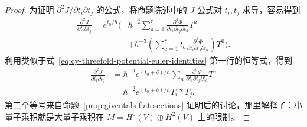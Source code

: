 \begin{proof}
为证明 $\partial^2J/\partial t_i\partial t_j$ 的公式，将命题陈述中的 $J$ 公式对 $t_i,t_j$ 求导，容易得到
\[
\begin{aligned}
\frac{\partial^2J}{\partial t_i\partial t_j}=e^{t_0/\hbar}\biggl(&
\hbar^{-2}\sum_{a=1}^r\frac{\partial^3\Phi}{\partial t_i\partial t_j\partial t_a}T^a\\
&+\hbar^{-3}\left(\sum_{a=1}^rt_a\frac{\partial^3\Phi}{\partial t_i\partial t_j\partial t_a}\right)T^0\biggr).
\end{aligned}
\]
利用类似于式~\eqref{eq:cy-threefold-potential-euler-identities} 第一行的恒等式，得到
\[
\begin{aligned}
\frac{\partial^2J}{\partial t_i\partial t_j}
&=\hbar^{-2}e^{(t_0+\delta)/\hbar}\sum_a
\frac{\partial^3\Phi}{\partial t_i\partial t_j\partial t_a}T^a\\
&=\hbar^{-2}e^{(t_0+\delta)/\hbar}T_i*T_j.
\end{aligned}
\]
第二个等号来自命题~\ref{prop:giventals-flat-sections} 证明后的讨论，那里解释了：小量子乘积就是大量子乘积在 $M=H^0(V)\oplus H^2(V)$ 上的限制。
\end{proof}

